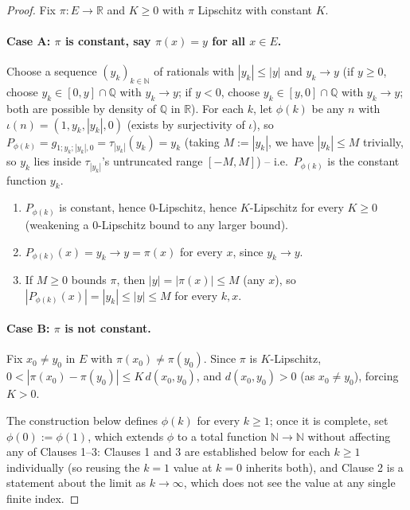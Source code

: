 \begin{proof}
  Fix $\pi \colon E \to \mathbb{R}$ and $K \ge 0$ with $\pi$ Lipschitz with constant $K$.

  \paragraph{Case A: $\pi$ is constant, say $\pi(x) = y$ for all $x \in E$.} Choose a sequence
  $(y_k)_{k \in \mathbb{N}}$ of rationals with $|y_k| \le |y|$ and $y_k \to y$ (if $y \ge 0$, choose
  $y_k \in [0,y] \cap \mathbb{Q}$ with $y_k \to y$; if $y < 0$, choose $y_k \in [y,0]\cap\mathbb{Q}$
  with $y_k \to y$; both are possible by density of $\mathbb{Q}$ in $\mathbb{R}$). For each $k$,
  let $\phi(k)$ be any $n$ with $\iota(n) = (1, y_k, |y_k|, 0)$ (exists by surjectivity of $\iota$),
  so $P_{\phi(k)} = g_{1;y_k;|y_k|,0} = \tau_{|y_k|}(y_k) = y_k$ (taking $M := |y_k|$, we have
  $|y_k| \le M$ trivially, so $y_k$ lies inside $\tau_{|y_k|}$'s untruncated range $[-M,M]$) --
  i.e.\ $P_{\phi(k)}$ is the constant function $y_k$.
  \begin{enumerate}
  \item $P_{\phi(k)}$ is constant, hence $0$-Lipschitz, hence $K$-Lipschitz for every $K \ge 0$
    (weakening a $0$-Lipschitz bound to any larger bound).
  \item $P_{\phi(k)}(x) = y_k \to y = \pi(x)$ for every $x$, since $y_k \to y$.
  \item If $M \ge 0$ bounds $\pi$, then $|y| = |\pi(x)| \le M$ (any $x$), so $|P_{\phi(k)}(x)| =
    |y_k| \le |y| \le M$ for every $k,x$.
  \end{enumerate}

  \paragraph{Case B: $\pi$ is not constant.} Fix $x_0 \ne y_0$ in $E$ with $\pi(x_0) \ne \pi(y_0)$.
  Since $\pi$ is $K$-Lipschitz, $0 < |\pi(x_0)-\pi(y_0)| \le K\,d(x_0,y_0)$, and $d(x_0,y_0) > 0$
  (as $x_0 \ne y_0$), forcing $K > 0$.

  The construction below defines $\phi(k)$ for every $k \ge 1$; once it is complete, set $\phi(0)
  := \phi(1)$, which extends $\phi$ to a total function $\mathbb{N} \to \mathbb{N}$ without
  affecting any of Clauses 1--3: Clauses 1 and 3 are established below for each $k \ge 1$
  individually (so reusing the $k=1$ value at $k=0$ inherits both), and Clause 2 is a statement
  about the limit as $k \to \infty$, which does not see the value at any single finite index.


\end{proof}
